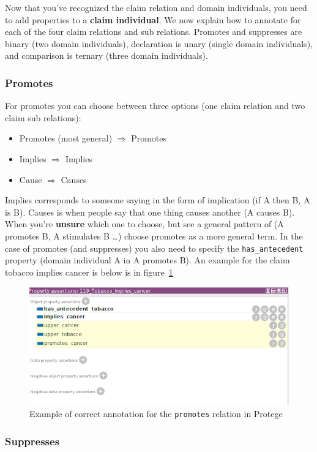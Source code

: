 Now that you’ve recognized the claim relation and domain individuals, you need
to add properties to a \textbf{claim individual}. We now explain how to annotate for
each of the four claim relations and sub relations. Promotes and suppresses are
binary (two domain individuals), declaration is unary (single domain
individuals), and comparison is ternary (three domain individuals). 

\subsubsection*{Promotes}

For promotes you can choose between three options (one claim relation and two
claim sub relations):
\begin{itemize}
\item Promotes (most general) $\Rightarrow$ Promotes 
\item Implies $\Rightarrow$ Implies
\item Cause $\Rightarrow$ Causes
\end{itemize}
Implies corresponds to someone saying in the form of implication (if A then B,
A is B). Causes is when people say that one thing causes another (A causes B).
When you’re \textbf{unsure} which one to choose, but see a general pattern of (A
promotes B, A stimulates B \dots) choose promotes as a more general term.
In the case of promotes (and suppresses) you also need to specify the
\texttt{has\_antecedent} property (domain individual A in A promotes B). An example for
the claim tobacco implies cancer is below is in figure~\ref{fig:promotes_example}

\begin{figure}
	\includegraphics{promotes.png}
	\caption{Example of correct annotation for the \texttt{promotes} relation in Protege}
\label{fig:promotes_example}
\end{figure}

\subsubsection*{Suppresses}


